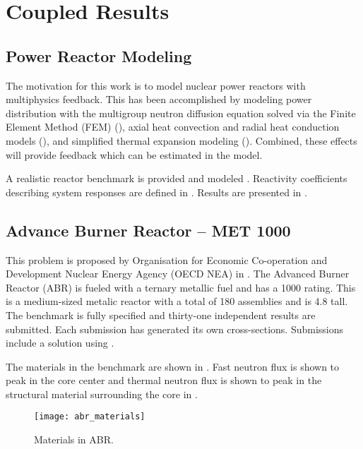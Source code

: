 \chapter{Coupled Results}
\label{ch:coupledResults}

\section{Power Reactor Modeling}
\label{sec:power_reactor_modeling}
  The motivation for this work is to model nuclear power reactors with
  multiphysics feedback. This has been accomplished by modeling power
  distribution with the multigroup neutron diffusion equation solved via the
  Finite Element Method (FEM) (), axial heat
  convection and radial heat conduction models (),
  and simplified thermal expansion modeling ().
  Combined, these effects will provide feedback which can be estimated in the
  model. 
  
  A realistic reactor benchmark is provided and modeled .
  Reactivity coefficients describing system responses are defined in
  . Results are presented in
  .

\section{Advance Burner Reactor -- MET 1000}
\label{sec:abr}
  This problem is proposed by Organisation for Economic Co-operation and
  Development Nuclear Energy Agency (OECD NEA) in \cite{abr}. The Advanced
  Burner Reactor (ABR) is fueled with a ternary metallic fuel and has a 1000
   rating. This is a medium-sized metalic reactor with a total of
  180 assemblies and is 4.8  tall. The benchmark is fully specified and
  thirty-one independent results are submitted. Each submission has generated
  its own cross-sections. Submissions include a solution using \dif.

  The materials in the benchmark are shown in . Fast
  neutron flux is shown to peak in the core center and thermal neutron flux is
  shown to peak in the structural material surrounding the core in
  .

  \begin{figure}
    \centering
    \texttt{[image: abr\_materials]}
    \caption{Materials in ABR.}
    \label{fig:abr_materials}
  \end{figure}

